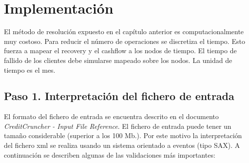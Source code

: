 
%
%
%
%
%
%
%
%
%

\chapter{Implementaci\'on}
\label{sec:implementation}

El m\'etodo de resoluci\'on expuesto en el cap\'itulo anterior es
computacionalmente muy costoso. Para reducir el n\'umero de operaciones
se discretiza el tiempo. Esto fuerza a mapear el recovery y el cashflow
a los nodos de tiempo. El tiempo de fallido de los clientes debe
simularse mapeado sobre los nodos. La unidad de tiempo es el mes.


\section{Paso 1. Interpretaci\'on del fichero de entrada}

El formato del fichero de entrada se encuentra descrito en el
documento \emph{CreditCruncher - Input File Reference}.
\newline
\newline
El fichero de entrada puede tener un tama\~no considerable (superior
a los 100 Mb.). Por este motivo la interpretaci\'on del fichero xml se
realiza usando un sistema orientado a eventos (tipo SAX). A continuaci\'on
se describen algunas de las validaciones m\'as importantes:

